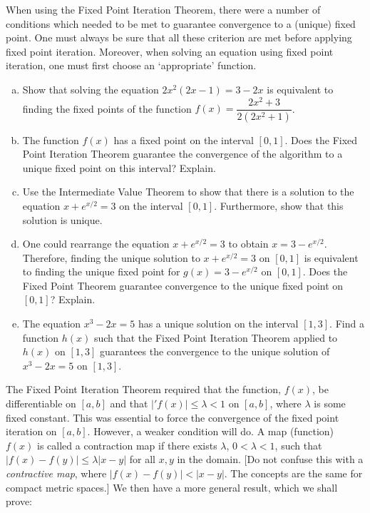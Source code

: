 \documentclass[11pt,letterpaper]{article}
\begin{document}
\newpage



 When using the Fixed Point Iteration Theorem, there were a number of conditions which needed to be met to guarantee convergence to a (unique) fixed point. One must always be sure that all these criterion are met before applying fixed point iteration. Moreover, when solving an equation using fixed point iteration, one must first choose an `appropriate' function. 
	\begin{enumerate}[(a)]
	\item Show that solving the equation $2x^2(2x - 1)= 3 - 2x$ is equivalent to finding the fixed points of the function $f(x)= \dfrac{2x^2 + 3}{2(2x^2 + 1)}$.
	\item The function $f(x)$ has a fixed point on the interval $[0, 1]$. Does the Fixed Point Iteration Theorem guarantee the convergence of the algorithm to a unique fixed point on this interval? Explain. 
	
	\item Use the Intermediate Value Theorem to show that there is a solution to the equation $x + e^{x/2}= 3$ on the interval $[0, 1]$. Furthermore, show that this solution is unique. 
	\item One could rearrange the equation $x + e^{x/2}= 3$ to obtain $x= 3 - e^{x/2}$. Therefore, finding the unique solution to $x + e^{x/2}= 3$ on $[0, 1]$ is equivalent to finding the unique fixed point for $g(x)= 3 - e^{x/2}$ on $[0, 1]$. Does the Fixed Point Theorem guarantee convergence to the unique fixed point on $[0, 1]$? Explain. 
	\item The equation $x^3 - 2x= 5$ has a unique solution on the interval $[1, 3]$. Find a function $h(x)$ such that the Fixed Point Iteration Theorem applied to $h(x)$ on $[1, 3]$ guarantees the convergence to the unique solution of $x^3 - 2x= 5$ on $[1, 3]$. 
	\end{enumerate}



\newpage



 The Fixed Point Iteration Theorem required that the function,  $f(x)$, be differentiable on $[a, b]$ and that $|'f(x)| \leq \lambda < 1$ on $[a, b]$, where $\lambda$ is some fixed constant. This was essential to force the convergence of the fixed point iteration on $[a, b]$. However, a weaker condition will do. A map (function) $f(x)$ is called a contraction map if there exists $\lambda$, $0 < \lambda < 1$, such that $|f(x) - f(y)| \leq \lambda |x - y|$ for all $x, y$ in the domain. [Do not confuse this with a \textit{contractive map}, where $|f(x) - f(y)| < |x - y|$. The concepts are the same for compact metric spaces.] We then have a more general result, which we shall prove: \pspace
\end{document}
